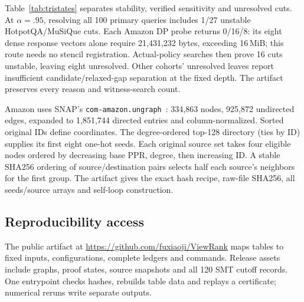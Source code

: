 Table~\ref{tab:tristates} separates stability, verified sensitivity and unresolved cuts. At $\alpha=.95$, resolving all 100 primary queries includes 1/27 unstable HotpotQA/MuSiQue cuts. Each Amazon DP probe returns 0/16/8: its eight dense response vectors alone require 21,431,232 bytes, exceeding 16\,MiB; this route needs no stencil registration. Actual-policy searches then prove 16 cuts unstable, leaving eight unresolved. Other cohorts' unresolved leaves report insufficient candidate/relaxed-gap separation at the fixed depth. The artifact preserves every reason and witness-search count.


Amazon uses SNAP's \texttt{com-amazon.ungraph}~\cite{snapamazon}: 334,863 nodes, 925,872 undirected edges, expanded to 1,851,744 directed entries and column-normalized. Sorted original IDs define coordinates. The degree-ordered top-128 directory (ties by ID) supplies its first eight one-hot seeds. Each original source set takes four eligible nodes ordered by decreasing base PPR, degree, then increasing ID. A stable SHA256 ordering of source/destination pairs selects half each source's neighbors for the first group. The artifact gives the exact hash recipe, raw-file SHA256, all seeds/source arrays and self-loop construction.

\subsection{Reproducibility access}
The public artifact at \url{https://github.com/fuxiaoji/ViewRank} maps tables to fixed inputs, configurations, complete ledgers and commands. Release assets include graphs, proof states, source snapshots and all 120 SMT cutoff records. One entrypoint checks hashes, rebuilds table data and replays a certificate; numerical reruns write separate outputs.
